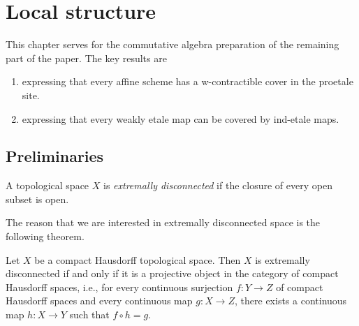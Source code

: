 \chapter{Local structure}

This chapter serves for the commutative algebra preparation of the remaining part of the paper. The key results are
\begin{enumerate}
  \item {} expressing that every affine scheme has a w-contractible cover in the proetale site.
  \item {} expressing that every weakly etale map can be covered by ind-etale maps.
\end{enumerate}

\section{Preliminaries}

\begin{definition}
  \label{def:extremally-disconnected}
  \mathlibok

  A topological space \(X\) is \emph{extremally disconnected} if the closure of every open subset is open.
\end{definition}

The reason that we are interested in extremally disconnected space is the following theorem.

\begin{theorem}
  \label{thm:extremally-disconnected-projective}
  \mathlibok
  Let \(X\) be a compact Hausdorff topological space. Then \(X\) is extremally disconnected if and only if it is a projective object in the category of compact Hausdorff spaces, i.e., for every continuous surjection \(f : Y \to Z\) of compact Hausdorff spaces and every continuous map \(g : X \to Z\), there exists a continuous map \(h : X \to Y\) such that \(f \circ h = g\).
\end{theorem}

